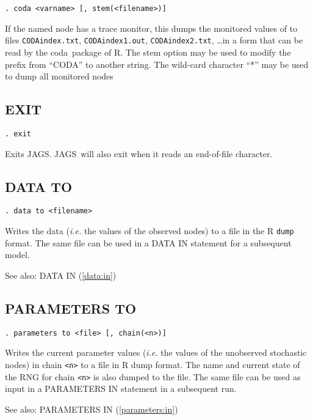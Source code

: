 \documentclass[11pt, a4paper, titlepage]{report}
\newcommand{\JAGS}{\textsf{JAGS}}
\newcommand{\R}{\textsf{R}}
\newcommand{\CODA}{\textsf{coda}}
\begin{document}
\begin{verbatim}
. coda <varname> [, stem(<filename>)]
\end{verbatim}
If the named node has a trace monitor, this dumps the monitored values
of to files \texttt{CODAindex.txt}, \texttt{CODAindex1.out},
\texttt{CODAindex2.txt}, \ldots in a form that can be read by the
\CODA\ package of \R.  The stem option may be used to modify the
prefix from ``CODA'' to another string.  The wild-card character ``*''
may be used to dump all monitored nodes

\subsection{EXIT}

\begin{verbatim}
. exit
\end{verbatim}
Exits \JAGS. \JAGS\ will also exit when it reads an end-of-file character.

\subsection{DATA TO}
\label{data:to}
\begin{verbatim}
. data to <filename>
\end{verbatim}
Writes the data ({\em i.e.} the values of the observed nodes) to a
file in the R \texttt{dump} format. The same file can be used in a
DATA IN statement for a subsequent model.

See also: DATA IN (\ref{data:in})

\subsection{PARAMETERS TO}
\label{parameters:to}
\begin{verbatim}
. parameters to <file> [, chain(<n>)]
\end{verbatim}
Writes the current parameter values ({\em i.e.} the values of the
unobserved stochastic nodes) in chain \texttt{<n>} to a file in R dump
format. The name and current state of the RNG for chain \texttt{<n>}
is also dumped to the file.  The same file can be used as input in a
PARAMETERS IN statement in a subsequent run.

See also: PARAMETERS IN (\ref{parameters:in})
\end{document}

